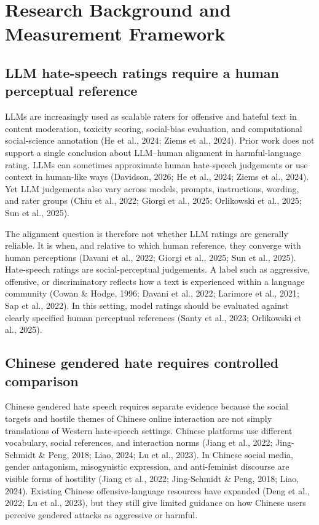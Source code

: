 \documentclass[a4paper,fleqn,review]{cas-sc}
\begin{document}
\section{Research Background and Measurement Framework}
\label{sec:background-framework}

\subsection{LLM hate-speech ratings require a human perceptual reference}

LLMs are increasingly used as scalable raters for offensive and hateful text in content moderation, toxicity scoring, social-bias evaluation, and computational social-science annotation (He et al., 2024; Ziems et al., 2024). Prior work does not support a single conclusion about LLM--human alignment in harmful-language rating. LLMs can sometimes approximate human hate-speech judgements or use context in human-like ways (Davidson, 2026; He et al., 2024; Ziems et al., 2024). Yet LLM judgements also vary across models, prompts, instructions, wording, and rater groups (Chiu et al., 2022; Giorgi et al., 2025; Orlikowski et al., 2025; Sun et al., 2025).

The alignment question is therefore not whether LLM ratings are generally reliable. It is when, and relative to which human reference, they converge with human perceptions (Davani et al., 2022; Giorgi et al., 2025; Sun et al., 2025). Hate-speech ratings are social-perceptual judgements. A label such as aggressive, offensive, or discriminatory reflects how a text is experienced within a language community (Cowan \& Hodge, 1996; Davani et al., 2022; Larimore et al., 2021; Sap et al., 2022). In this setting, model ratings should be evaluated against clearly specified human perceptual references (Santy et al., 2023; Orlikowski et al., 2025).

\subsection{Chinese gendered hate requires controlled comparison}

Chinese gendered hate speech requires separate evidence because the social targets and hostile themes of Chinese online interaction are not simply translations of Western hate-speech settings. Chinese platforms use different vocabulary, social references, and interaction norms (Jiang et al., 2022; Jing-Schmidt \& Peng, 2018; Liao, 2024; Lu et al., 2023). In Chinese social media, gender antagonism, misogynistic expression, and anti-feminist discourse are visible forms of hostility (Jiang et al., 2022; Jing-Schmidt \& Peng, 2018; Liao, 2024). Existing Chinese offensive-language resources have expanded (Deng et al., 2022; Lu et al., 2023), but they still give limited guidance on how Chinese users perceive gendered attacks as aggressive or harmful.
\end{document}
